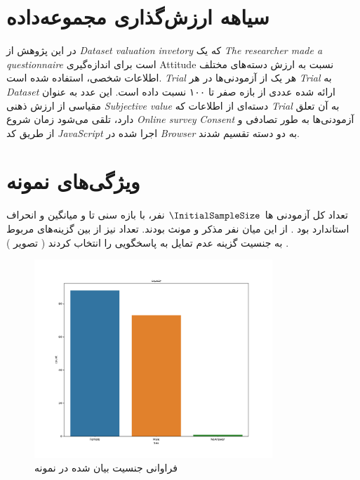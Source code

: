 \section{سیاهه ارزش‌گذاری مجموعه‌داده}
در این پژوهش از
{\textit{\gls{Dataset valuation invetory}}}
که یک
{\textit{\gls{The researcher made a questionnaire}}}
است برای اندازه‌گیری
\gls{Attitude}
نسبت به ارزش دسته‌های مختلف اطلاعات شخصی، استفاده شده است.
\textit{\gls{Trial}}
هر یک از آزمودنی‌ها در هر
\textit{\gls{Trial}}
به
\textit{\gls{Dataset}}
ارائه شده عددی از بازه صفر تا ۱۰۰ نسبت داده است. این عدد به عنوان مقیاسی از ارزش ذهنی
\textit{\gls{Subjective value}}
دسته‌ای از اطلاعات که
\textit{\gls{Trial}}
به آن تعلق دارد، تلقی می‌شود
زمان شروع
\textit{\gls{Online survey}}
\textit{\gls{Consent}}
آزمودنی‌ها به طور تصادفی و از طریق کد
\textit{\gls{JavaScript}}
اجرا شده در
\textit{\gls{Browser}}
به دو دسته تقسیم شدند.
\section{ویژگی‌های نمونه}
تعداد کل آزمودنی ها
$\InitialSampleSize$
نفر،
با بازه سنی
\ageMin
تا
\ageMax
و
میانگین
\sampleAgeMean
و انحراف استاندارد
\sampleAgeSD
بود
\!.
از این میان
\SampleSizeMale
نفر مذکر و
\SampleSizeFemale
مونث بودند.
تعداد
\SampleSizeSexualityNoAnswer
نیز از بین گزینه‌های مربوط به جنسیت گزینه عدم تمایل به پاسخگویی را انتخاب کردند
(
تصویر \label{fig:sexualityAgainstPopulation}
)
\!.


% 

\begin{figure}[htpb]
    \centering
    \includegraphics[width=0.8\textwidth]{./img/sexualityAgainstPopulation.pdf}
    \caption{فراوانی جنسیت بیان شده در نمونه}
    \label{fig:sexualityAgainstPopulation}
\end{figure}

